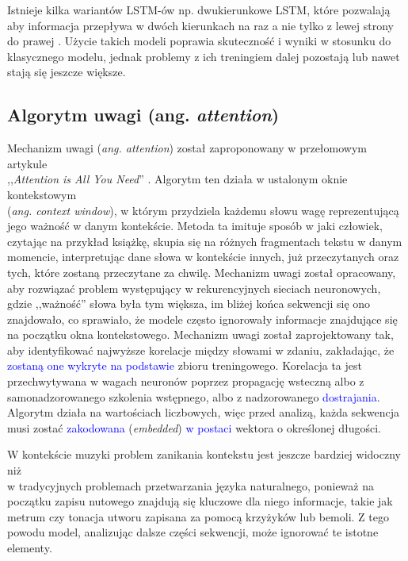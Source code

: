 \documentclass[data-science]{agh-wi} %
\begin{document}
Istnieje kilka wariantów LSTM-ów np. dwukierunkowe LSTM, które pozwalają aby informacja przepływa w dwóch kierunkach na raz a nie tylko z lewej strony do prawej \cite{bi_lstm}. Użycie takich modeli poprawia skuteczność i wyniki w stosunku do klasycznego modelu, jednak problemy z ich treningiem dalej pozostają lub nawet stają się jeszcze większe.

\subsection{Algorytm uwagi (ang. \textit{attention})}
\label{sec:attention}
Mechanizm uwagi (\textit{ang. attention}) został zaproponowany w przełomowym artykule \\,,\textit{Attention is All You Need}'' \cite{attention}. Algorytm ten działa w ustalonym oknie kontekstowym \\ (\textit{ang. context window}), w którym przydziela każdemu słowu wagę reprezentującą jego ważność w danym kontekście. Metoda ta imituje sposób w jaki człowiek, czytając na przykład książkę, skupia się na różnych fragmentach tekstu w danym momencie, interpretując dane słowa w kontekście innych, już przeczytanych oraz tych, które zostaną przeczytane za chwilę. Mechanizm uwagi został opracowany, aby rozwiązać problem występujący w rekurencyjnych sieciach neuronowych, gdzie ,,ważność'' słowa była tym większa, im bliżej końca sekwencji się ono znajdowało, co sprawiało, że modele często ignorowały informacje znajdujące się \\ na początku okna kontekstowego. Mechanizm uwagi został zaprojektowany tak, aby identyfikować najwyższe korelacje między słowami w zdaniu, zakładając, że \textcolor{blue}{zostaną one wykryte na podstawie} zbioru treningowego. Korelacja ta jest przechwytywana w wagach neuronów poprzez propagację wsteczną albo z samonadzorowanego szkolenia wstępnego, albo z nadzorowanego \textcolor{blue}{dostrajania}. Algorytm działa na wartościach liczbowych, więc przed analizą, każda sekwencja musi zostać \textcolor{blue}{zakodowana} (\textit{embedded}) \textcolor{blue}{w postaci} wektora o określonej długości.

W kontekście muzyki problem zanikania kontekstu jest jeszcze bardziej widoczny niż \\ w tradycyjnych problemach przetwarzania języka naturalnego, ponieważ na początku zapisu nutowego znajdują się kluczowe dla niego informacje, takie jak metrum czy tonacja utworu zapisana za pomocą krzyżyków lub bemoli. Z tego powodu model, analizując dalsze części sekwencji, może ignorować te istotne elementy.
\end{document}
